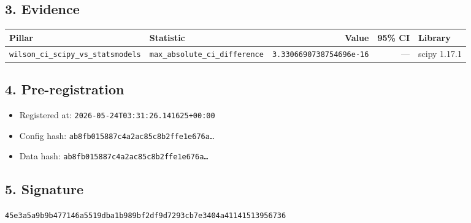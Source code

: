 \documentclass{article}
\begin{document}
\subsection*{3. Evidence}
\begin{tabular}{llrrl}\toprule
\textbf{Pillar} & \textbf{Statistic} & \textbf{Value} & \textbf{95\% CI} & \textbf{Library} \\\midrule
\texttt{wilson\_ci\_scipy\_vs\_statsmodels} & \texttt{max\_absolute\_ci\_difference} & \texttt{3.3306690738754696e-16} & --- & scipy 1.17.1 \\
\bottomrule\end{tabular}
\subsection*{4. Pre-registration}
\begin{itemize}
\item Registered at: \texttt{2026-05-24T03:31:26.141625+00:00}
\item Config hash: \texttt{ab8fb015887c4a2ac85c8b2ffe1e676a\dots}
\item Data hash: \texttt{ab8fb015887c4a2ac85c8b2ffe1e676a\dots}
\end{itemize}
\subsection*{5. Signature}
\texttt{45e3a5a9b9b477146a5519dba1b989bf2df9d7293cb7e3404a41141513956736}\\
\end{document}

